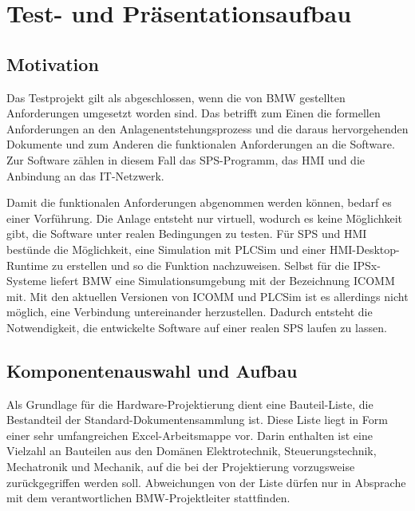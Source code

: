 

\chapter{Test- und Präsentationsaufbau}

\section{Motivation}
\label{sec:testingRackMotivation}

Das Testprojekt gilt als abgeschlossen, wenn die von BMW gestellten Anforderungen umgesetzt worden sind. Das betrifft zum Einen die formellen Anforderungen an den Anlagenentstehungsprozess und die daraus hervorgehenden Dokumente und zum Anderen die funktionalen Anforderungen an die Software. Zur Software zählen in diesem Fall das SPS-Programm, das HMI und die Anbindung an das IT-Netzwerk. 

Damit die funktionalen Anforderungen abgenommen werden können, bedarf es einer Vorführung. Die Anlage entsteht nur virtuell, wodurch es keine Möglichkeit gibt, die Software unter realen Bedingungen zu testen. Für SPS und HMI bestünde die Möglichkeit, eine Simulation mit PLCSim und einer HMI-Desktop-Runtime zu erstellen und so die Funktion nachzuweisen. Selbst für die IPSx-Systeme liefert BMW eine Simulationsumgebung mit der Bezeichnung ICOMM mit. Mit den aktuellen Versionen von ICOMM und PLCSim ist es allerdings nicht möglich, eine Verbindung untereinander herzustellen. Dadurch entsteht die Notwendigkeit, die entwickelte Software auf einer realen SPS laufen zu lassen.

\section{Komponentenauswahl und Aufbau}
\label{sec:componentsAndAssembly}

Als Grundlage für die Hardware-Projektierung dient eine Bauteil-Liste, die Bestandteil der Standard-Dokumentensammlung ist. Diese Liste liegt in Form einer sehr umfangreichen Excel-Arbeitsmappe vor. Darin enthalten ist eine Vielzahl an Bauteilen aus den Domänen Elektrotechnik, Steuerungstechnik, Mechatronik und Mechanik, auf die bei der Projektierung vorzugsweise zurückgegriffen werden soll. Abweichungen von der Liste dürfen nur in Absprache mit dem verantwortlichen BMW-Projektleiter stattfinden.

